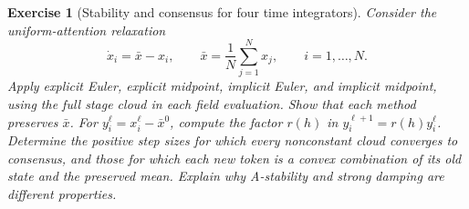 \documentclass[11pt]{amsart}
\numberwithin{equation}{section}
\theoremstyle{plain}
\newtheorem{exercise}[theorem]{Exercise}
\begin{document}
\begin{exercise}[Stability and consensus for four time integrators]
\label{ex:attention-integrators-consensus}
Consider the uniform-attention relaxation
\[
 \dot x_i=\bar x-x_i,
 \qquad \bar x=\frac1N\sum_{j=1}^N x_j,
 \qquad i=1,\ldots,N.
\]
Apply explicit Euler, explicit midpoint, implicit Euler, and implicit
midpoint, using the full stage cloud in each field evaluation.  Show that
each method preserves $\bar x$.  For $y_i^\ell=x_i^\ell-\bar x^0$, compute
the factor $r(h)$ in $y_i^{\ell+1}=r(h)y_i^\ell$.  Determine the positive
step sizes for which every nonconstant cloud converges to consensus, and
those for which each new token is a convex combination of its old state
and the preserved mean.  Explain why A-stability and strong damping are
different properties.
\end{exercise}
\end{document}
